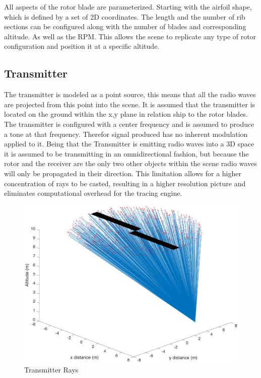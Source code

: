 All aspects of the rotor blade are parameterized. Starting with the airfoil shape, which is defined by a set of 2D coordinates. The length and the number of rib sections can be configured along with the number of blades and corresponding altitude. As well as the RPM. This allows the scene to replicate any type of rotor configuration and position it at a specific altitude.

\subsection{Transmitter}
The transmitter is modeled as a point source, this means that all the radio waves are projected from this point into the scene. It is assumed that the transmitter is located on the ground within the x,y plane in relation ship to the rotor blades. The transmitter is configured with a center frequency and is assumed to produce a tone at that frequency. Therefor signal produced has no inherent modulation applied to it.
Being that the Transmitter is emitting radio waves into a 3D space it is assumed to be transmitting in an omnidirectional fashion, but because the rotor and the receiver are the only two other objects within the scene radio waves will only be propagated in their direction. This limitation allows for a higher concentration of rays to be casted, resulting in a higher resolution picture and eliminates computational overhead for the tracing engine.

\begin{figure}
	\begin{center}
		\includegraphics[width=15cm]{images/radio_propagation/transmitted.eps}
		\caption{Transmitter Rays}
		\label{fig:transmitter_direction}
	\end{center}
\end{figure}

